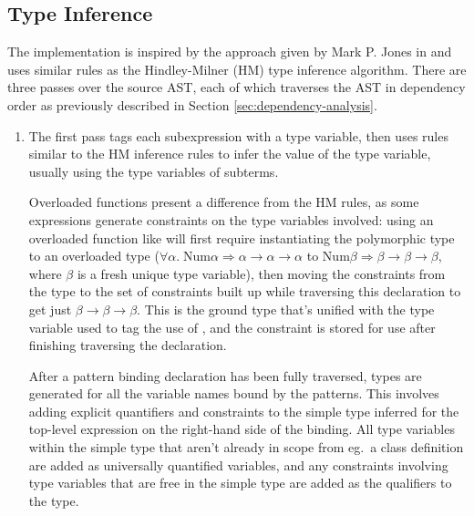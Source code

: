 \documentclass[dissertation.tex]{subfiles}
\begin{document}
{{    }
    \subsection{Type Inference}
    {

        The implementation is inspired by the approach given by Mark P. Jones in \cite{THIH} and uses similar rules as
        the Hindley-Milner (HM) type inference algorithm. There are three passes over the source AST, each of which
        traverses the AST in dependency order as previously described in Section \ref{sec:dependency-analysis}.

        \begin{enumerate}
        \item
        {
            
            The first pass tags each subexpression with a type variable, then uses rules similar to the HM inference
            rules to infer the value of the type variable, usually using the type variables of subterms.
            
            Overloaded functions present a difference from the HM rules, as some expressions generate constraints on the
            type variables involved: using an overloaded function like \haskell{(+)} will first require instantiating
            the polymorphic type to an overloaded type
            (\(\forall\alpha.\;\text{Num}\alpha\Rightarrow\alpha\rightarrow\alpha\rightarrow\alpha\) to
            \(\text{Num}\beta\Rightarrow\beta\rightarrow\beta\rightarrow\beta\), where \(\beta\) is a fresh unique type
            variable), then moving the constraints from the type to the set of constraints built up while traversing
            this declaration to get just \(\beta\rightarrow\beta\rightarrow\beta\). This is the ground type that's
            unified with the type variable used to tag the use of \haskell{(+)}, and the constraint is stored for use
            after finishing traversing the declaration.

            After a pattern binding declaration has been fully traversed, types are generated for all the variable names
            bound by the patterns. This involves adding explicit quantifiers and constraints to the simple type inferred
            for the top-level expression on the right-hand side of the binding. All type variables within the simple
            type that aren't already in scope from eg.\ a class definition are added as universally quantified
            variables, and any constraints involving type variables that are free in the simple type are added as the
            qualifiers to the type.

}
\end{enumerate}}}
\end{document}
